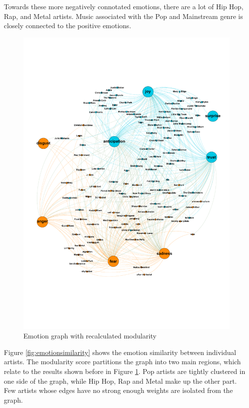 \documentclass[10pt,a4paper]{article}
\begin{document}
		Towards these more negatively connotated emotions, there are a lot of Hip Hop, Rap, and Metal artists. Music associated with the Pop and Mainstream genre is closely connected to the positive emotions.
		
		\begin{figure}[htb]
			\centering
			\includegraphics[trim=0mm 50mm 0mm 45mm, clip, width=\linewidth]{data/emotion_graph_new_modularity}
			\caption{Emotion graph with recalculated modularity}
			\label{fig:emotionnewmod}
		\end{figure}
		
		Figure \ref{fig:emotionsimilarity} shows the emotion similarity between individual artists. The modularity score partitions the graph into two main regions, which relate to the results shown before in Figure \ref{fig:emotionnewmod}. Pop artists are tightly clustered in one side of the graph, while Hip Hop, Rap and Metal make up the other part. Few artists whose edges have no strong enough weights are isolated from the graph.
		
\end{document}
